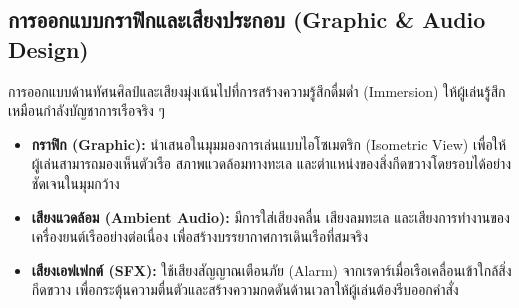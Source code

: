 \subsection{การออกแบบกราฟิกและเสียงประกอบ (Graphic \& Audio Design)}

การออกแบบด้านทัศนศิลป์และเสียงมุ่งเน้นไปที่การสร้างความรู้สึกดื่มด่ำ (Immersion) ให้ผู้เล่นรู้สึกเหมือนกำลังบัญชาการเรือจริง ๆ

\begin{itemize}
    \item \textbf{กราฟิก (Graphic):} นำเสนอในมุมมองการเล่นแบบไอโซเมตริก (Isometric View) เพื่อให้ผู้เล่นสามารถมองเห็นตัวเรือ สภาพแวดล้อมทางทะเล และตำแหน่งของสิ่งกีดขวางโดยรอบได้อย่างชัดเจนในมุมกว้าง
    \item \textbf{เสียงแวดล้อม (Ambient Audio):} มีการใส่เสียงคลื่น เสียงลมทะเล และเสียงการทำงานของเครื่องยนต์เรืออย่างต่อเนื่อง เพื่อสร้างบรรยากาศการเดินเรือที่สมจริง
    \item \textbf{เสียงเอฟเฟกต์ (SFX):} ใช้เสียงสัญญาณเตือนภัย (Alarm) จากเรดาร์เมื่อเรือเคลื่อนเข้าใกล้สิ่งกีดขวาง เพื่อกระตุ้นความตื่นตัวและสร้างความกดดันด้านเวลาให้ผู้เล่นต้องรีบออกคำสั่ง
\end{itemize}